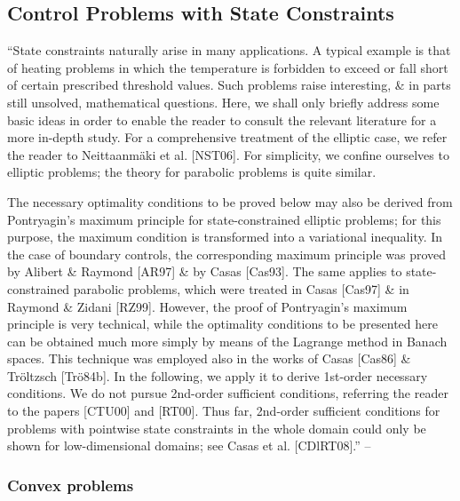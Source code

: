 \documentclass[oneside]{book}
\numberwithin{equation}{section}
\begin{document}
\subsection{Control Problems with State Constraints}
``State constraints naturally arise in many applications. A typical example is that of heating problems in which the temperature is forbidden to exceed or fall short of certain prescribed threshold values. Such problems raise interesting, \& in parts still unsolved, mathematical questions. Here, we shall only briefly address some basic ideas in order to enable the reader to consult the relevant literature for a more in-depth study. For a comprehensive treatment of the elliptic case, we refer the reader to Neittaanm\"aki et al. [NST06]. For simplicity, we confine ourselves to elliptic problems; the theory for parabolic problems is quite similar.

The necessary optimality conditions to be proved below may also be derived from Pontryagin's maximum principle for state-constrained elliptic problems; for this purpose, the maximum condition is transformed into a variational inequality. In the case of boundary controls, the corresponding maximum principle was proved by Alibert \& Raymond [AR97] \& by Casas [Cas93]. The same applies to state-constrained parabolic problems, which were treated in Casas [Cas97] \& in Raymond \& Zidani [RZ99]. However, the proof of Pontryagin's maximum principle is very technical, while the optimality conditions to be presented here can be obtained much more simply by means of the Lagrange method in Banach spaces. This technique was employed also in the works of Casas [Cas86] \& Tr\"oltzsch [Tr\"o84b]. In the following, we apply it to derive 1st-order necessary conditions. We do not pursue 2nd-order sufficient conditions, referring the reader to the papers [CTU00] and [RT00]. Thus far, 2nd-order sufficient conditions for problems with pointwise state constraints in the whole domain could only be shown for low-dimensional domains; see Casas et al. [CDlRT08].'' -- \cite[Sect. 6.2, pp. 338--339]{Troltzsch2010}

\subsubsection{Convex problems}
\end{document}
